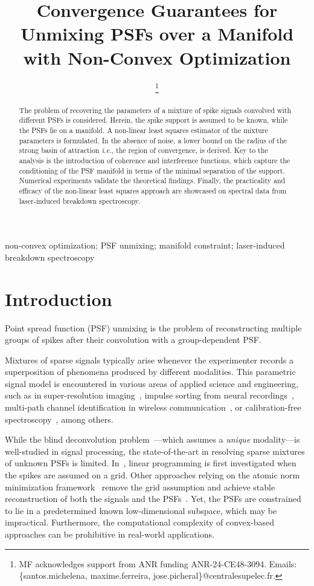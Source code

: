 \documentclass[conference,english,final,svgnames]{IEEEtran}
\title{Convergence Guarantees for Unmixing PSFs over a Manifold with Non-Convex Optimization}
\author{
    \IEEEauthorblockN{
        Santos Michelena\IEEEauthorrefmark{1}\IEEEauthorrefmark{2}, Maxime Ferreira Da Costa\IEEEauthorrefmark{1}, and José Picheral\IEEEauthorrefmark{1}
    }
    \IEEEauthorblockA{
        \IEEEauthorrefmark{1}Laboratory of Signals and Systems, CentraleSupélec, Université Paris–Saclay, CNRS, Gif-sur-Yvette, France\\
        \IEEEauthorrefmark{2}Iumtek, Orsay, France
    }
    \vspace{-20pt}
  \thanks{
       MF acknowledges support from ANR funding ANR-24-CE48-3094. Emails:  \{santos.michelena, maxime.ferreira, jose.picheral\}@centralesupelec.fr.
    }
}
\begin{document}
\maketitle

\begin{abstract}
    The problem of recovering the parameters of a mixture of spike signals convolved with different PSFs is considered. Herein, the spike support is assumed to be known, while the PSFs lie on a manifold. A non-linear least squares estimator of the mixture parameters is formulated. In the absence of noise, a lower bound on the radius of the strong basin of attraction \emph{i.e.}, the region of convergence, is derived. Key to the analysis is the introduction of coherence and interference functions, which capture the conditioning of the PSF manifold in terms of the minimal separation of the support. Numerical experiments validate the theoretical findings. Finally, the practicality and efficacy of the non-linear least squares approach are showcased on spectral data from laser-induced breakdown spectroscopy.
\end{abstract}

\begin{IEEEkeywords}
non-convex optimization; PSF unmixing; manifold constraint; laser-induced breakdown spectroscopy
\end{IEEEkeywords}
\section{Introduction}

Point spread function (PSF) unmixing is the problem of reconstructing multiple groups of spikes after their convolution with a group-dependent PSF.

Mixtures of sparse signals typically arise whenever the experimenter records a superposition of phenomena produced by different modalities. This parametric signal model is encountered in various areas of applied science and engineering, such as in super-resolution imaging~\cite{huang2008three,huang2018single}, impulse sorting from neural recordings~\cite{knudson2014inferring,li2014sparse}, multi-path channel identification in wireless communication~\cite{applebaum2012asynchronous,chi2013compressive}, or calibration-free spectroscopy~\cite{HU2022116618}, among others.

While the blind deconvolution problem~\cite{li2016identifiability,li2019multichannel}---which assumes a \emph{unique} modality---is well-studied in signal processing,  the state-of-the-art in resolving sparse mixtures of unknown PSFs is limited. In~\cite{romberg2010sparse}, linear programming is first investigated when the spikes are assumed on a grid. Other approaches relying on the atomic norm minimization framework~\cite{chi2020harnessing} remove the grid assumption and achieve stable reconstruction of both the signals and the PSFs~\cite{chi_guaranteed_2016, Li_2020}. Yet, the PSFs are constrained to lie in a predetermined known low-dimensional subspace, which may be impractical. Furthermore, the computational complexity of convex-based approaches can be prohibitive in real-world applications.
\end{document}
